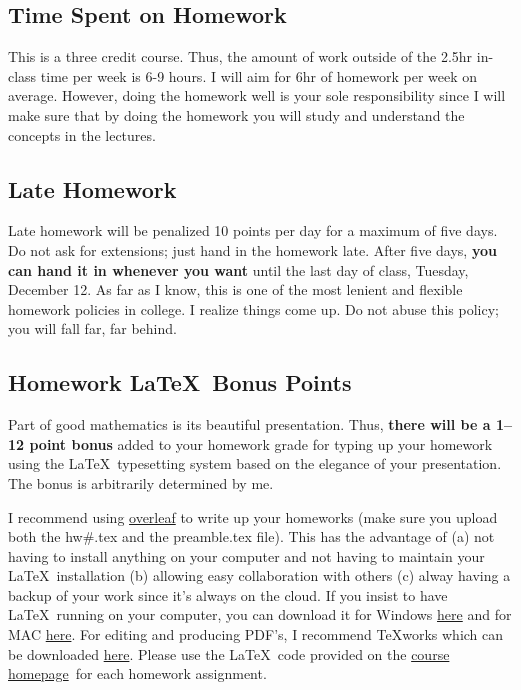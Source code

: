 \documentclass[12pt]{article}
\newcommand{\ingreen}[1]{\color{green}\textbf{#1} \color{black}}
\newcommand{\coursewebpage}{\href{https://github.com/kapelner/QC_Math_241_Fall_2017}{course homepage}}
\begin{document}
\subsection*{Time Spent on Homework }

This is a three credit course. Thus, the amount of work outside of the 2.5hr in-class time per week is 6-9 hours. I will aim for 6hr of homework per week on average. However, doing the homework well is your sole responsibility since I will make sure that by doing the homework you will study and understand the concepts in the lectures.

\subsection*{Late Homework}

Late homework will be penalized 10 points per day for a maximum of five days. Do not ask for extensions; just hand in the homework late. After five days, \textbf{you can hand it in whenever you want} until the last day of class, Tuesday, December 12. As far as I know, this is one of the most lenient and flexible homework policies in college. I realize things come up. Do not abuse this policy; you will fall far, far behind.

\subsection*{Homework \LaTeX~Bonus Points}

Part of good mathematics is its beautiful presentation. Thus, \ingreen{there will be a 1--12 point bonus} added to your homework grade  for typing up your homework using the \LaTeX ~typesetting system based on the elegance of your presentation. The bonus is arbitrarily determined by me.

I recommend using \href{http://overleaf.com}{overleaf} to write up your homeworks (make sure you upload both the hw\#.tex and the preamble.tex file). This has the advantage of (a) not having to install anything on your computer and not having to maintain your \LaTeX ~installation (b) allowing easy collaboration with others (c) alway having a backup of your work since it's always on the cloud. If you insist to have \LaTeX ~running on your computer, you can download it for Windows \href{http://www.miktex.org/download}{here} and for MAC \href{http://www.tug.org/mactex/}{here}. For editing and producing PDF's, I recommend \TeX works which can be downloaded \href{http://www.tug.org/texworks/#Getting_TeXworks}{here}. Please use the \LaTeX ~code provided on the \coursewebpage ~for each homework assignment. 
\end{document}

